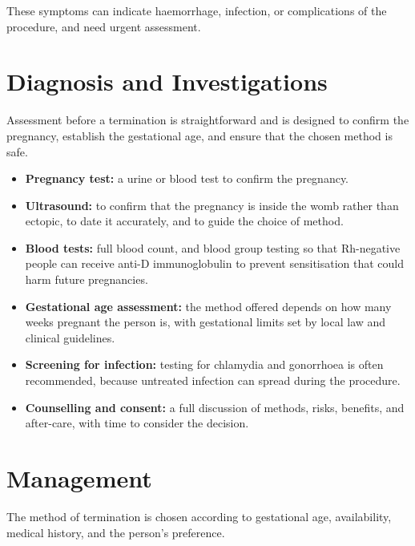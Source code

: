These symptoms can indicate haemorrhage, infection, or complications of the procedure, and need urgent assessment.

\section*{Diagnosis and Investigations}
Assessment before a termination is straightforward and is designed to confirm the pregnancy, establish the gestational age, and ensure that the chosen method is safe.

\begin{itemize}
    \item \textbf{Pregnancy test:} a urine or blood test to confirm the pregnancy.
    \item \textbf{Ultrasound:} to confirm that the pregnancy is inside the womb rather than ectopic, to date it accurately, and to guide the choice of method.
    \item \textbf{Blood tests:} full blood count, and blood group testing so that Rh-negative people can receive anti-D immunoglobulin to prevent sensitisation that could harm future pregnancies.
    \item \textbf{Gestational age assessment:} the method offered depends on how many weeks pregnant the person is, with gestational limits set by local law and clinical guidelines.
    \item \textbf{Screening for infection:} testing for chlamydia and gonorrhoea is often recommended, because untreated infection can spread during the procedure.
    \item \textbf{Counselling and consent:} a full discussion of methods, risks, benefits, and after-care, with time to consider the decision.
\end{itemize}

\section*{Management}
The method of termination is chosen according to gestational age, availability, medical history, and the person's preference.

